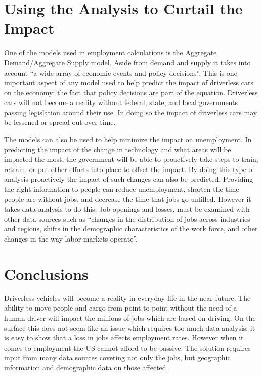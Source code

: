 \documentclass[sigconf]{acmart}
\begin{document}
\section{Using the Analysis to Curtail the Impact}

One of the models used in employment calculations is the Aggregate 
Demand/Aggregate Supply model.  Aside from demand and supply it takes into 
account ``a wide array of economic events and policy decisions''.
\cite{OpenStax} This is one important aspect of any model used to help 
predict the impact of driverless cars on the economy; the fact that policy 
decisions are part of the equation.  Driverless cars will not become a 
reality without federal, state, and local governments passing legislation 
around their use.  In doing so the impact of driverless cars may be 
lessened or spread out over time.  

The models can also be used to help minimize the impact on unemployment.  
In predicting the impact of the change in technology and what areas will 
be impacted the most, the government will be able to proactively take steps 
to train, retrain, or put other efforts into place to offset the impact.  
By doing this type of analysis proactively the impact of such changes can 
also be predicted.  Providing the right information to people can reduce 
unemployment, shorten the time people are without jobs, and decrease the 
time that jobs go unfilled.   However it takes data analysis to do this.  
Job openings and losses, must be examined with other data sources such 
as ``changes in the distribution of jobs across industries and regions, 
shifts in the demographic characteristics of the work force, and other 
changes in the way labor markets operate''.\cite{JOLTS}

\section{Conclusions}

Driverless vehicles will become a reality in everyday life in the near future.  
The ability to move people and cargo from point to point without the need of a 
human driver will impact the millions of jobs which are based on driving.  On 
the surface this does not seem like an issue which requires too much data 
analysis; it is easy to show that a loss in jobs affects employment rates.  
However when it comes to employment the US cannot afford to be passive.  The 
solution requires input from many data sources covering not only the jobs, 
but geographic information and demographic data on those affected.    
\end{document}
